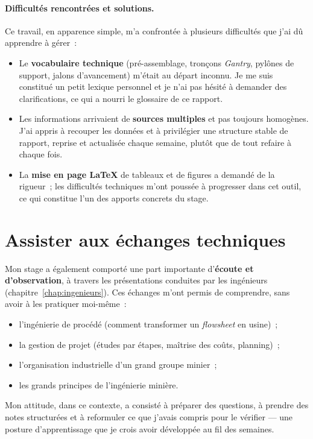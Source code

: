 \paragraph{Difficultés rencontrées et solutions.} Ce travail, en apparence simple, m'a confrontée à plusieurs difficultés que j'ai dû apprendre à gérer~:
\begin{itemize}
\item Le \textbf{vocabulaire technique} (pré-assemblage, tronçons \textit{Gantry}, pylônes de support, jalons d'avancement) m'était au départ inconnu. Je me suis constitué un petit lexique personnel et je n'ai pas hésité à demander des clarifications, ce qui a nourri le glossaire de ce rapport.
\item Les informations arrivaient de \textbf{sources multiples} et pas toujours homogènes. J'ai appris à recouper les données et à privilégier une structure stable de rapport, reprise et actualisée chaque semaine, plutôt que de tout refaire à chaque fois.
\item La \textbf{mise en page \LaTeX} de tableaux et de figures a demandé de la rigueur~; les difficultés techniques m'ont poussée à progresser dans cet outil, ce qui constitue l'un des apports concrets du stage.
\end{itemize}

\section{Assister aux échanges techniques}

Mon stage a également comporté une part importante d'\textbf{écoute et d'observation}, à travers les présentations conduites par les ingénieurs (chapitre~\ref{chap:ingenieurs}). Ces échanges m'ont permis de comprendre, sans avoir à les pratiquer moi-même~:

\begin{itemize}
\item l'ingénierie de procédé (comment transformer un \textit{flowsheet} en usine)~;
\item la gestion de projet (études par étapes, maîtrise des coûts, planning)~;
\item l'organisation industrielle d'un grand groupe minier~;
\item les grands principes de l'ingénierie minière.
\end{itemize}

Mon attitude, dans ce contexte, a consisté à préparer des questions, à prendre des notes structurées et à reformuler ce que j'avais compris pour le vérifier --- une posture d'apprentissage que je crois avoir développée au fil des semaines.

